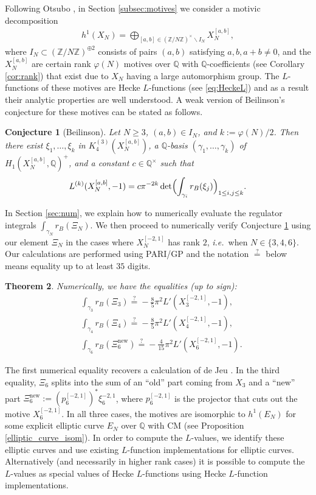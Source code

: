 \documentclass[11pt,a4,leqno]{amsart}
\theoremstyle{my theoremstyle}
\newtheorem{thm}{Theorem}[section]
\newtheorem{conj}[thm]{Conjecture}
\theoremstyle{dfn}
\theoremstyle{remark}
\renewcommand{\1}{\mathbbm{1}}
\newcommand{\Z}{\mathbb{Z}}
\newcommand{\Q}{\mathbb{Q}}
\numberwithin{equation}{section}
\begin{document}
Following Otsubo \cite{Ots11}, in Section \ref{subsec:motives} we consider a motivic decomposition 
\begin{align*}
h^1(X_{N}) = \bigoplus_{[a, b] \in (\Z/N\Z)^\times \backslash I_N} X_N^{[a, b]},  
\end{align*}
where $I_N \subset (\Z/N\Z)^{\oplus 2}$ consists of pairs $(a,b)$ satisfying $a,b,a+b\neq 0$, and the $X_N^{[a, b]}$ are certain rank $\varphi(N)$ motives over $\Q$ with $\Q$-coefficients (see Corollary \ref{cor:rank}) that exist due to $X_N$ having a large automorphism group. The $L$-functions of these motives are Hecke $L$-functions (see \eqref{eq:HeckeL}) and as a result their analytic properties are well understood.
A weak version of Beilinson's conjecture for these motives can be stated as follows. 
\begin{conj}[Beilinson]\label{conj:weakBeiintro}
    Let $N \geq 3$, $(a,b) \in I_N$, and $k := \varphi(N)/2$. Then there exist $\xi_1, \ldots, \xi_{k}$ in $K_4^{(3)}(X_N^{[a,b]})$, a $\Q$-basis $(\gamma_1, \ldots, \gamma_{k})$ of $H_1(X_N^{[a,b]}, \Q)^+$, and a constant $c \in \Q^\times$ such that
    \begin{equation*} 
        L^{(k)}(X_N^{[a,b]},-1) = c \pi^{-2k} \det \Bigl(\int_{\gamma_i} r_B(\xi_j) \Bigr)_{1 \leq i,j \leq k}.
    \end{equation*}
\end{conj}
In Section \ref{sec:num}, we explain how to numerically evaluate the regulator integrals 
$\int_{\gamma_N} r_B(\Xi_N)$.
We then proceed to numerically verify Conjecture \ref{conj:weakBeiintro} using our element $\Xi_N$ in the cases where $X^{[-2,1]}_N$ has rank $2$, \emph{i.e.}~when $N\in \{ 3,4,6 \}$. Our calculations are performed using PARI/GP \cite{PARI} and the notation $\overset{?}{=}$ below means equality up to at least $35$ digits.
\begin{thm}\label{thm7}
    Numerically, we have the equalities (up to sign):
    \[
    \begin{split}
        &\int_{\gamma_3} r_B(\Xi_3) \stackrel{?}{=} -\frac85 \pi^2 L'(X_3^{[-2,1]},-1), \\
        &\int_{\gamma_4} r_B(\Xi_4) \stackrel{?}{=} -\frac85 \pi^2 L'(X_4^{[-2,1]},-1), \\
        &\int_{\gamma_6} r_B(\Xi_6^{\mathrm{new}}) \stackrel{?}{=} - \frac4{15} \pi^2 L'(X_6^{[-2,1]},-1).
    \end{split}
    \]
\end{thm}
The first numerical equality recovers a calculation of de Jeu \cite{JeuSlides}. In the third equality, $\Xi_6$ splits into the sum of an ``old'' part coming from $X_3$ and a ``new'' part $\Xi_6^{\mathrm{new}}:=(p_6^{[-2,1]})^* \xi_6^{-2,1}$, where $p_6^{[-2,1]}$ is the projector that cuts out the motive $X_6^{[-2,1]}$. In all three cases, the motives are isomorphic to $h^1(E_N)$ for some explicit elliptic curve $E_N$ over $\Q$ with CM (see Proposition \ref{elliptic_curve_isom}). In order to compute the $L$-values, we identify these elliptic curves and use existing $L$-function implementations for elliptic curves. Alternatively (and necessarily in higher rank cases) it is possible to compute the $L$-values as special values of Hecke $L$-functions using Hecke $L$-function implementations. 
\end{document}
